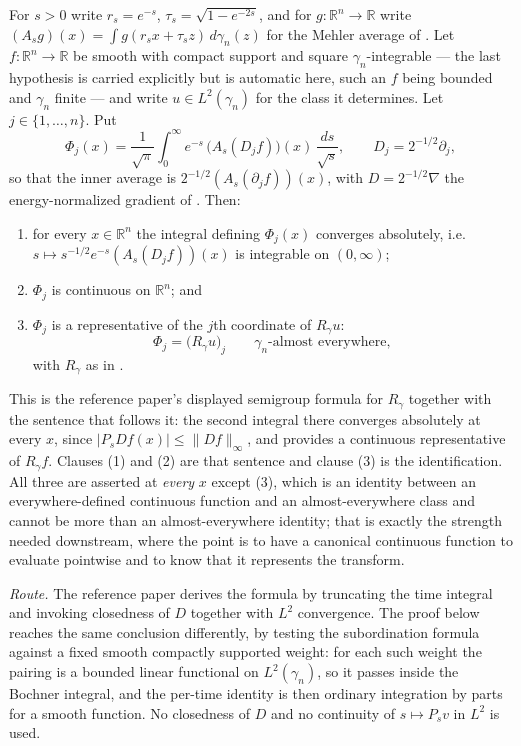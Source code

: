 \begin{lemma}
For $s > 0$ write $r_s = e^{-s}$, $\tau_s = \sqrt{1-e^{-2s}}$, and for
$g : \mathbb{R}^n \to \mathbb{R}$ write
$(A_s g)(x) = \int g(r_s x + \tau_s z)\,d\gamma_n(z)$ for the Mehler average of
.  Let $f : \mathbb{R}^n \to \mathbb{R}$ be smooth with
compact support and square $\gamma_n$-integrable --- the last hypothesis is
carried explicitly but is automatic here, such an $f$ being bounded and
$\gamma_n$ finite --- and write $u \in L^2(\gamma_n)$ for the class it
determines.  Let $j \in \{1,\ldots,n\}$.  Put
\[
  \Phi_j(x) = \frac{1}{\sqrt\pi}\int_0^\infty
      e^{-s}\,\bigl(A_s(D_j f)\bigr)(x)\,\frac{ds}{\sqrt s},
  \qquad D_j = 2^{-1/2}\partial_j ,
\]
so that the inner average is $2^{-1/2}(A_s(\partial_j f))(x)$, with
$D = 2^{-1/2}\nabla$ the energy-normalized gradient of .  Then:
\begin{enumerate}
\item for every $x \in \mathbb{R}^n$ the integral defining $\Phi_j(x)$ converges
absolutely, i.e.\ $s \mapsto s^{-1/2}e^{-s}(A_s(D_jf))(x)$ is integrable on
$(0,\infty)$;
\item $\Phi_j$ is continuous on $\mathbb{R}^n$; and
\item $\Phi_j$ is a representative of the $j$th coordinate of $R_\gamma u$:
\[
  \Phi_j = \bigl(R_\gamma u\bigr)_j \qquad \gamma_n\text{-almost everywhere},
\]
with $R_\gamma$ as in .
\end{enumerate}

This is the reference paper's displayed semigroup formula for $R_\gamma$ together
with the sentence that follows it: the second integral there converges
absolutely at every $x$, since $|P_sDf(x)| \leq \|Df\|_\infty$, and provides a
continuous representative of $R_\gamma f$.  Clauses (1) and (2) are that
sentence and clause (3) is the identification.  All three are asserted at
\emph{every} $x$ except (3), which is an identity between an everywhere-defined
continuous function and an almost-everywhere class and cannot be more than an
almost-everywhere identity; that is exactly the strength needed downstream,
where the point is to have a canonical continuous function to evaluate
pointwise and to know that it represents the transform.

\emph{Route.}  The reference paper derives the formula by truncating the time
integral and invoking closedness of $D$ together with $L^2$ convergence.  The
proof below reaches the same conclusion differently, by testing the subordination
formula against a fixed smooth compactly supported weight: for each such weight
the pairing is a bounded linear functional on $L^2(\gamma_n)$, so it passes
inside the Bochner integral, and the per-time identity is then ordinary
integration by parts for a smooth function.  No closedness of $D$ and no
continuity of $s \mapsto P_s v$ in $L^2$ is used.
\end{lemma}

